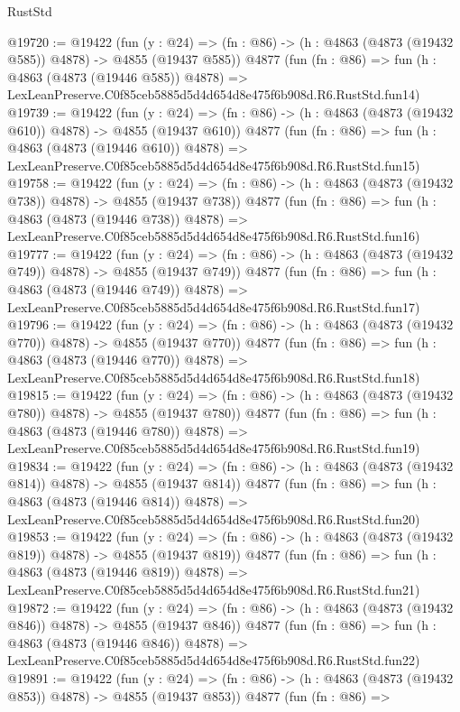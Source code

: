 \begin{lexlean}{RustStd}
\begin{coremodule}
@19720 := @19422
    (fun (y : @24) => (fn : @86) -> (h : @4863 (@4873 (@19432 @585)) @4878) -> @4855 (@19437 @585))
    @4877
    (fun (fn : @86) =>
    fun (h : @4863 (@4873 (@19446 @585)) @4878) =>
    LexLeanPreserve.C0f85ceb5885d5d4d654d8e475f6b908d.R6.RustStd.fun14)
@19739 := @19422
    (fun (y : @24) => (fn : @86) -> (h : @4863 (@4873 (@19432 @610)) @4878) -> @4855 (@19437 @610))
    @4877
    (fun (fn : @86) =>
    fun (h : @4863 (@4873 (@19446 @610)) @4878) =>
    LexLeanPreserve.C0f85ceb5885d5d4d654d8e475f6b908d.R6.RustStd.fun15)
@19758 := @19422
    (fun (y : @24) => (fn : @86) -> (h : @4863 (@4873 (@19432 @738)) @4878) -> @4855 (@19437 @738))
    @4877
    (fun (fn : @86) =>
    fun (h : @4863 (@4873 (@19446 @738)) @4878) =>
    LexLeanPreserve.C0f85ceb5885d5d4d654d8e475f6b908d.R6.RustStd.fun16)
@19777 := @19422
    (fun (y : @24) => (fn : @86) -> (h : @4863 (@4873 (@19432 @749)) @4878) -> @4855 (@19437 @749))
    @4877
    (fun (fn : @86) =>
    fun (h : @4863 (@4873 (@19446 @749)) @4878) =>
    LexLeanPreserve.C0f85ceb5885d5d4d654d8e475f6b908d.R6.RustStd.fun17)
@19796 := @19422
    (fun (y : @24) => (fn : @86) -> (h : @4863 (@4873 (@19432 @770)) @4878) -> @4855 (@19437 @770))
    @4877
    (fun (fn : @86) =>
    fun (h : @4863 (@4873 (@19446 @770)) @4878) =>
    LexLeanPreserve.C0f85ceb5885d5d4d654d8e475f6b908d.R6.RustStd.fun18)
@19815 := @19422
    (fun (y : @24) => (fn : @86) -> (h : @4863 (@4873 (@19432 @780)) @4878) -> @4855 (@19437 @780))
    @4877
    (fun (fn : @86) =>
    fun (h : @4863 (@4873 (@19446 @780)) @4878) =>
    LexLeanPreserve.C0f85ceb5885d5d4d654d8e475f6b908d.R6.RustStd.fun19)
@19834 := @19422
    (fun (y : @24) => (fn : @86) -> (h : @4863 (@4873 (@19432 @814)) @4878) -> @4855 (@19437 @814))
    @4877
    (fun (fn : @86) =>
    fun (h : @4863 (@4873 (@19446 @814)) @4878) =>
    LexLeanPreserve.C0f85ceb5885d5d4d654d8e475f6b908d.R6.RustStd.fun20)
@19853 := @19422
    (fun (y : @24) => (fn : @86) -> (h : @4863 (@4873 (@19432 @819)) @4878) -> @4855 (@19437 @819))
    @4877
    (fun (fn : @86) =>
    fun (h : @4863 (@4873 (@19446 @819)) @4878) =>
    LexLeanPreserve.C0f85ceb5885d5d4d654d8e475f6b908d.R6.RustStd.fun21)
@19872 := @19422
    (fun (y : @24) => (fn : @86) -> (h : @4863 (@4873 (@19432 @846)) @4878) -> @4855 (@19437 @846))
    @4877
    (fun (fn : @86) =>
    fun (h : @4863 (@4873 (@19446 @846)) @4878) =>
    LexLeanPreserve.C0f85ceb5885d5d4d654d8e475f6b908d.R6.RustStd.fun22)
@19891 := @19422
    (fun (y : @24) => (fn : @86) -> (h : @4863 (@4873 (@19432 @853)) @4878) -> @4855 (@19437 @853))
    @4877
    (fun (fn : @86) =>

\end{coremodule}
\end{lexlean}
